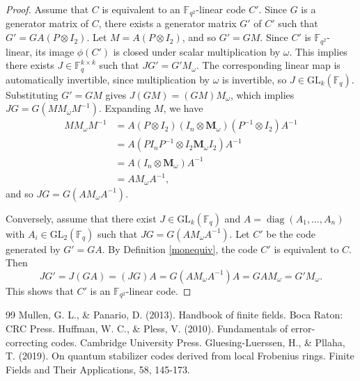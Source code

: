 \documentclass[10pt,a4paper]{amsart}
\theoremstyle{plain}
\theoremstyle{definition}
\begin{document}
\begin{proof} 
 Assume that $C$ is equivalent to an $\mathbb{F}_{q^2}$-linear code $C'$.  Since $G$ is a generator matrix of $C$, there exists a generator matrix $G'$ of $C'$ such that $G' = G A(P \otimes I_2)$. Let $M = A(P \otimes I_2)$, and so $G' = GM$. 
Since  $C'$ is $\mathbb{F}_{q^2}$-linear, its image $\phi(C')$ is closed under scalar multiplication by $\omega$. 
 This implies there exists $J \in \mathbb{F}_q^{k \times k}$ such that $J G' = G' M_\omega$. The corresponding linear map is automatically invertible, since multiplication by $\omega$ is invertible, so $J \in \mathrm{GL}_k(\mathbb{F}_q)$.
Substituting $G' = GM$ gives $J (GM) = (GM) M_\omega$, which implies $J G = G(M M_\omega M^{-1})$. Expanding $M$, we have
\begin{align*}
M M_\omega M^{-1} &= A(P \otimes I_2) (I_n \otimes \mathbf{M}_\omega) (P^{-1} \otimes I_2) A^{-1} \\
  &= A(P I_n P^{-1} \otimes I_2 \mathbf{M}_\omega I_2) A^{-1} \\
  &= A(I_n \otimes \mathbf{M}_\omega) A^{-1} \\
  &= A M_\omega A^{-1},
\end{align*} 
and so $J G = G (A M_\omega A^{-1}).$

Conversely, assume that there exist $J \in \textrm{GL}_k(\mathbb{F}_q)$ and $A = \operatorname{diag}(A_1, \dots, A_n)$ 
with $A_i \in \textrm{GL}_2(\mathbb{F}_q)$
such that $J G = G (A M_\omega A^{-1})$.
Let $C'$ be the code generated by $G' = GA$. 
By Definition \ref{monequiv}, the code $C'$ is equivalent  to $C$. 
Then
\[ J G' = J(GA) = (JG)A = G(AM_\omega A^{-1})A = GAM_\omega = G'M_\omega. \]
This shows that $C'$ is an $\mathbb{F}_{q^2}$-linear code.
\end{proof}

\begin{thebibliography}{99}
 Mullen, G. L., \& Panario, D. (2013). Handbook of finite fields. Boca Raton: CRC Press. %
 Huffman, W. C., \& Pless, V. (2010). Fundamentals of error-correcting codes. Cambridge University Press. %
 Gluesing-Luerssen, H., \& Pllaha, T. (2019). On quantum stabilizer codes derived from local Frobenius rings. Finite Fields and Their Applications, 58, 145-173.
\end{thebibliography}
\end{document}
